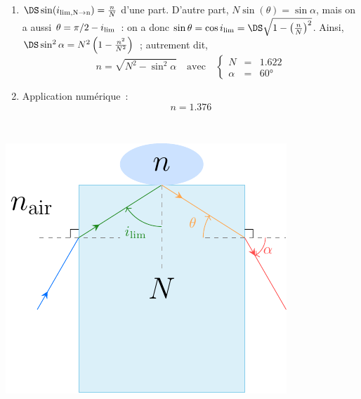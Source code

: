 \documentclass[../../main/main.tex]{subfiles}
\begin{document}
{\begin{minipage}[t]{.68\linewidth}
		\begin{enumerate}
			\item $\DS \sin(i_{\rm lim, N\rightarrow n}) = \frac{n}{N}$ d'une part.
			      D'autre part, $N\sin(\theta) = \sin\alpha$, mais on a aussi $\theta =
				      \pi/2 - i_{\rm lim}$~: on a donc $\sin\theta = \cos i_{\rm lim} = \DS
				      \sqrt{1- \left(\frac{n}{N}\right)^2}$. Ainsi, $\DS\sin^2\alpha = N^2
				      \left( 1 - \frac{n^2}{N^2} \right)$~; autrement dit,
			      \begin{equation*}
				      \boxed{n = \sqrt{N^2 - \sin^2\alpha}}
				      \quad\text{avec}\quad
				      \left\{
				      \begin{array}{rcl}
					      N      & = & \num{1.622} \\
					      \alpha & = & \ang{60;;}
				      \end{array}
				      \right.
			      \end{equation*}
			\item Application numérique~:
			      \[\boxed{n = \num{1.376}}\]
		\end{enumerate}
	\end{minipage}
	\hfill
	\begin{minipage}[t]{.3\linewidth}
		~
		\begin{center}
			\includegraphics[width=\linewidth]{pulrich}
			\label{fig:pulrich_plain}
		\end{center}
	\end{minipage}
}
\end{document}
